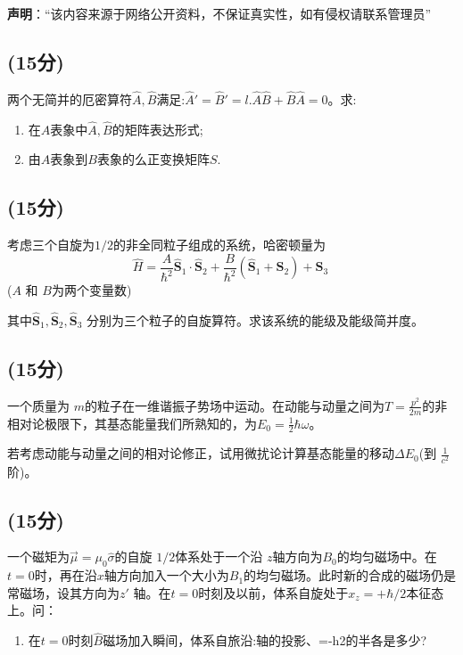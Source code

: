 
\textbf{声明}：“该内容来源于网络公开资料，不保证真实性，如有侵权请联系管理员”

\subsection{(15分)}
两个无简并的厄密算符$\hat{A},\hat{B}$满足:$\hat{A}'=\hat{B}'=l$.$\hat{A}\hat{B}+\hat{B}\hat{A}=0$。求:
\begin{enumerate}
\item 在$A$表象中$\hat{A},\hat{B}$的矩阵表达形式;
\item 由$A$表象到$B$表象的么正变换矩阵$S$.
\end{enumerate}
\subsection{(15分)}
考虑三个自旋为$1/2$的非全同粒子组成的系统，哈密顿量为$$\hat{H} = \frac{A}{\hbar^2} \hat{\mathbf{S}}_1 \cdot \hat{\mathbf{S}}_2 + \frac{B}{\hbar^2} (\hat{\mathbf{S}}_1  + \hat{\mathbf{S}}_2)+\hat{\mathbf{S}}_3~$$ ($A$ 和 $B$为两个变量数)

其中$\hat{\mathbf{S}}_1, \hat{\mathbf{S}}_2, \hat{\mathbf{S}}_3$ 分别为三个粒子的自旋算符。求该系统的能级及能级简并度。
\subsection{(15分)}
 一个质量为 $m$的粒子在一维谐振子势场中运动。在动能与动量之间为$T = \frac{p^2}{2m}$的非相对论极限下，其基态能量我们所熟知的，为$E_0 = \frac{1}{2}\hbar\omega$。

若考虑动能与动量之间的相对论修正，试用微扰论计算基态能量的移动$\Delta E_0$(到 $\frac{1}{c^2}$阶)。
\subsection{(15分)}
一个磁矩为$\vec{\mu} = \mu_0 \hat{\sigma}$的自旋 $1/2$体系处于一个沿 $z$轴方向为$B_0$的均匀磁场中。在$t=0$时，再在沿$x$轴方向加入一个大小为$B_1$的均匀磁场。此时新的合成的磁场仍是常磁场，设其方向为$z'$ 轴。在$t=0$时刻及以前，体系自旋处于$x_{z} = +\hbar/2$本征态上。问：
\begin{enumerate}
\item 在$t=0$时刻$\hat{B}$磁场加入瞬间，体系自旅沿:轴的投影、=-h2的半各是多少?
\end{enumerate}
